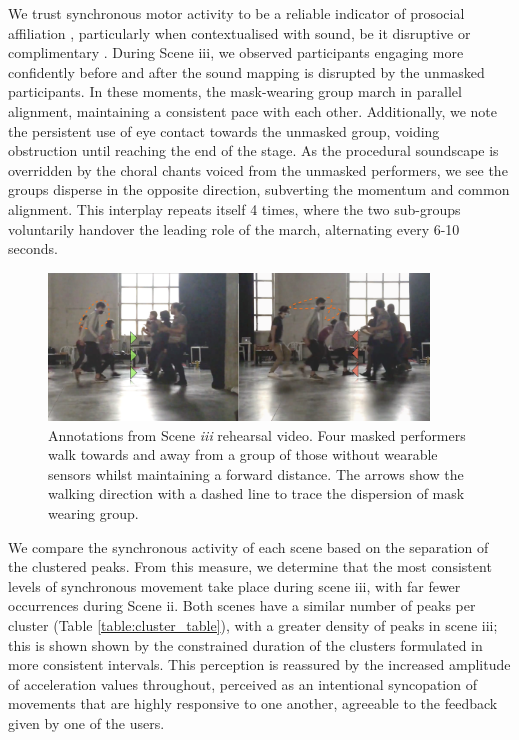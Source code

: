 We trust synchronous motor activity to be a reliable indicator of prosocial affiliation \citep{hadley_synchrony_2021}, particularly when contextualised with sound, be it disruptive or complimentary \citep{solberg_group_2019}. During Scene iii, we observed participants engaging more confidently before and after the sound mapping is disrupted by the unmasked participants. In these moments, the mask-wearing group march in parallel alignment, maintaining a consistent pace with each other. Additionally, we note the persistent use of eye contact towards the unmasked group, voiding obstruction until reaching the end of the stage. As the procedural soundscape is overridden by the choral chants voiced from the unmasked performers, we see the groups disperse in the opposite direction, subverting the momentum and common alignment. This interplay repeats itself 4 times, where the two sub-groups voluntarily handover the leading role of the march, alternating every 6-10 seconds.

\begin{figure}[!h]
\centering
\includegraphics[width=0.9\textwidth,keepaspectratio]{Chapters/Figures/adse_ess/scene_iii-merged-2.png}
{
\caption[Annotations from Scene \textit{iii} rehearsal video]{Annotations from Scene \textit{iii} rehearsal video. Four masked performers walk towards and away from a group of those without wearable sensors whilst maintaining a forward distance. The arrows show the walking direction with a dashed line to trace the dispersion of mask wearing group.
}
\label{fig:scene_iii_annotation}
}
\end{figure}

We compare the synchronous activity of each scene based on the separation of the clustered peaks. From this measure, we determine that the most consistent levels of synchronous movement take place during scene iii, with far fewer occurrences during Scene ii. Both scenes have a similar number of peaks per cluster (Table \ref{table:cluster_table}), with a greater density of peaks in scene iii; this is shown shown by the constrained duration of the clusters formulated in more consistent intervals. This perception is reassured by the increased amplitude of acceleration values throughout, perceived as an intentional syncopation of movements that are highly responsive to one another, agreeable to the feedback given by one of the users.

